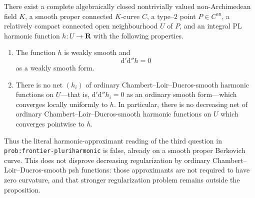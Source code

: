 \begin{proposition}
There exist a complete algebraically closed nontrivially valued
non-Archimedean field $K$, a smooth proper connected $K$-curve $C$, a
type--$2$ point $P\in C^{\mathrm{an}}$, a relatively compact connected open
neighbourhood $U$ of $P$, and an integral PL harmonic function
$h:U\to\mathbf R$ with the following properties.
\begin{enumerate}
\item The function $h$ is weakly smooth and
\[
                         \mathrm d'\mathrm d''h=0
\]
as a weakly smooth form.
\item There is no net $(h_i)$ of ordinary Chambert--Loir--Ducros-smooth
harmonic functions on $U$---that is,
$\mathrm d'\mathrm d''h_i=0$ as an ordinary smooth form---which converges
locally uniformly to $h$.
In particular, there is no decreasing net of ordinary
Chambert--Loir--Ducros-smooth harmonic functions on $U$ which converges
pointwise to $h$.
\end{enumerate}
Thus the literal harmonic-approximant reading of the third question in
\textup{\texttt{prob:frontier-pluriharmonic}} is false, already on a smooth
proper Berkovich curve.  This does not disprove decreasing regularization by
ordinary Chambert--Loir--Ducros-smooth psh functions: those approximants are
not required to have zero curvature, and that stronger regularization
problem remains outside the proposition.
\end{proposition}

